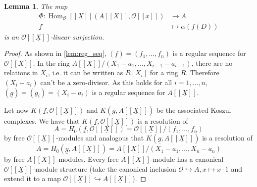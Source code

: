 \documentclass{article}
\theoremstyle{plain}%
\newtheorem{lemma}{Lemma}[section]
\theoremstyle{definition}
\theoremstyle{remark}
\renewcommand{\hom}{\operatorname{Hom}}
\begin{document}
    \begin{lemma}
        The map
        \begin{align*}
            \Phi\colon \hom_\mathcal{O}[[\underline{X}]](A[[\underline{X}]], \mathcal{O}[[\underline{x}]]) &\to A\\
            f &\mapsto \alpha(f(D))
        \end{align*}
        is an \(\mathcal{O}[[\underline{X}]]\)-linear surjection.
    \end{lemma}
    \begin{proof}
        As shown in \cref{lem:reg_seq}, \((\underline{f}) = (f_1, \dots, f_n)\) 
        is a regular sequence for \(\mathcal{O}[[\underline{X}]]\).
        In the ring \(A[[\underline{X}]]/(X_1 - a_1, \dots, X_{i-1} - a_{i-1})\), there are no relations in \(X_i\),
        i.e. it can be written as \(R[X_i]\) for a ring \(R\). Therefore \((X_i - a_i)\) can't be a zero-divisor.
        As this holds for all \(i = 1, \dots, n\), \((\underline{g}) = (g_i) = (X_i - a_i)\) is a regular sequence 
        for \(A[[\underline{X}]]\).
        
        Let now \(K(\underline{f}, \mathcal{O}[[\underline{X}]])\) and \(K(\underline{g}, A[[\underline{X}]])\)
        be the associated Koszul complexes. 
        We have that \(K(\underline{f}, \mathcal{O}[[\underline{X}]])\) is a resolution of 
        \[
            A = H_0(\underline{f}, \mathcal{O}[[\underline{X}]]) = \mathcal{O}[[\underline{X}]]/(f_1, \dots, f_n)
        \]
        by free \(\mathcal{O}[[\underline{X}]]\)-modules
        and analogous that \(K(\underline{g}, A[[\underline{X}]])\) is a resolution of
        \[
            A = H_0(\underline{g}, A[[\underline{X}]]) = A[[\underline{X}]]/(X_1 - a_1, \dots, X_n-a_n)
        \]
        by free \(A[[\underline{X}]]\)-modules.
        Every free \(A[[\underline{X}]]\)-module has a canonical \(\mathcal{O}[[\underline{X}]]\)-module structure 
        (take the canonical inclusion \(\mathcal{O} \hookrightarrow A, x \mapsto x\cdot 1\) and extend it to a map
        \(\mathcal{O}[[\underline{X}]] \hookrightarrow A[[\underline{X}]]\)).


\end{proof}
\end{document}
